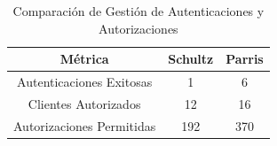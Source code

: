 \begin{table}[H]
\centering
\begin{tabular}{|c|c|c|}
\hline
\textbf{Métrica} & \textbf{Schultz} & \textbf{Parris} \\
\hline
\hspace{30pt}Autenticaciones Exitosas\hspace{30pt} &
\hspace{30pt}1\hspace{30pt} & 
\hspace{30pt}6\hspace{30pt} \\
\hline
\hspace{30pt}Clientes Autorizados\hspace{30pt} &
\hspace{30pt}12\hspace{30pt} & 
\hspace{30pt}16\hspace{30pt} \\
\hline
\hspace{30pt}Autorizaciones Permitidas\hspace{30pt} &
\hspace{30pt}192\hspace{30pt} & 
\hspace{30pt}370\hspace{30pt} \\
\hline
\end{tabular}
\caption{Comparación de Gestión de Autenticaciones y Autorizaciones}
\label{auten_com}
\end{table}
